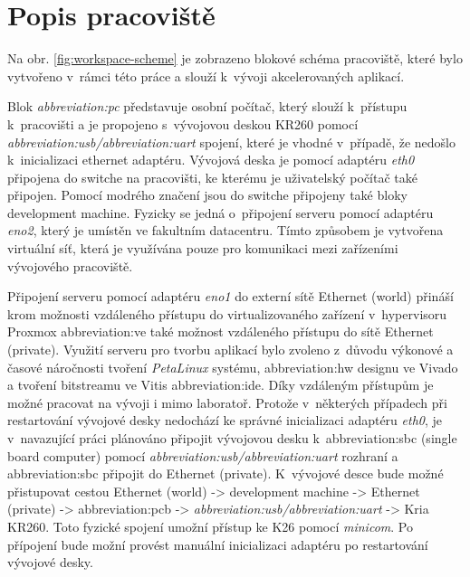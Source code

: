 \documentclass[a4paper, twoside, 11pt]{article}
\begin{document}
\section{Popis pracoviště}\label{sec:popis-pracoviste}
	Na obr. \ref{fig:workspace-scheme} je zobrazeno blokové schéma pracoviště, které bylo vytvořeno v~rámci této práce a slouží k~vývoji akcelerovaných aplikací.\par
	Blok \textit{\gls{abbreviation:pc}} představuje osobní počítač, který slouží k~přístupu k~pracovišti a je propojeno s~vývojovou deskou KR260 pomocí \textit{\gls{abbreviation:usb}/\gls{abbreviation:uart}} spojení, které je vhodné v~případě, že nedošlo k~inicializaci ethernet adaptéru. Vývojová deska je pomocí adaptéru \textit{eth0} připojena do switche na pracovišti, ke kterému je uživatelský počítač také připojen. Pomocí \textcolor{ctublue}{modrého značení} jsou do switche připojeny také bloky \textcolor{ctuorange}{development machine}. Fyzicky se jedná o~připojení serveru pomocí adaptéru \textit{eno2}, který je umístěn ve fakultním datacentru. Tímto způsobem je vytvořena virtuální síť, která je využívána pouze pro komunikaci mezi zařízeními vývojového pracoviště.\par
	Připojení serveru pomocí adaptéru \textit{eno1} do externí sítě \textcolor{ctugreenyblue}{Ethernet (world)} přináší krom možnosti vzdáleného přístupu do virtualizovaného zařízení v~hypervisoru Proxmox \gls{abbreviation:ve} také možnost vzdáleného přístupu do sítě \textcolor{ctublue}{Ethernet (private)}. Využití serveru pro tvorbu aplikací bylo zvoleno z~důvodu výkonové a časové náročnosti tvoření \textit{PetaLinux} systému, \gls{abbreviation:hw} designu ve Vivado a tvoření bitstreamu ve Vitis \gls{abbreviation:ide}. Díky vzdáleným přístupům je možné pracovat na vývoji i mimo laboratoř. Protože v~některých případech při restartování vývojové desky nedochází ke správné inicializaci adaptéru \textit{eth0}, je v~navazující práci plánováno připojit vývojovou desku k~\gls{abbreviation:sbc} (single board computer) pomocí \textit{\gls{abbreviation:usb}/\gls{abbreviation:uart}} rozhraní a \gls{abbreviation:sbc} připojit do \textcolor{ctublue}{Ethernet (private)}. K~vývojové desce bude možné přistupovat cestou \textcolor{ctugreenyblue}{Ethernet (world)} -> \textcolor{ctuorange}{development machine} -> \textcolor{ctublue}{Ethernet (private)} -> \gls{abbreviation:pcb} -> \textit{\gls{abbreviation:usb}/\gls{abbreviation:uart}} -> Kria KR260. Toto fyzické spojení umožní přístup ke K26 pomocí \textit{minicom}. Po přípojení bude možní provést manuální inicializaci adaptéru po restartování vývojové desky.\par
\end{document}
